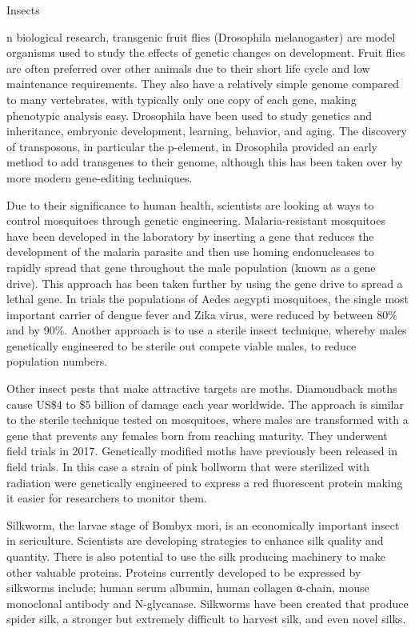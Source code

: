 Insects

n biological research, transgenic fruit flies (Drosophila melanogaster) are model organisms used to study the effects of genetic changes on development. Fruit flies are often preferred over other animals due to their short life cycle and low maintenance requirements. They also have a relatively simple genome compared to many vertebrates, with typically only one copy of each gene, making phenotypic analysis easy. Drosophila have been used to study genetics and inheritance, embryonic development, learning, behavior, and aging. The discovery of transposons, in particular the p-element, in Drosophila provided an early method to add transgenes to their genome, although this has been taken over by more modern gene-editing techniques.

Due to their significance to human health, scientists are looking at ways to control mosquitoes through genetic engineering. Malaria-resistant mosquitoes have been developed in the laboratory by inserting a gene that reduces the development of the malaria parasite and then use homing endonucleases to rapidly spread that gene throughout the male population (known as a gene drive). This approach has been taken further by using the gene drive to spread a lethal gene. In trials the populations of Aedes aegypti mosquitoes, the single most important carrier of dengue fever and Zika virus, were reduced by between 80\% and by 90\%. Another approach is to use a sterile insect technique, whereby males genetically engineered to be sterile out compete viable males, to reduce population numbers.

Other insect pests that make attractive targets are moths. Diamondback moths cause US\$4 to \$5 billion of damage each year worldwide. The approach is similar to the sterile technique tested on mosquitoes, where males are transformed with a gene that prevents any females born from reaching maturity. They underwent field trials in 2017. Genetically modified moths have previously been released in field trials. In this case a strain of pink bollworm that were sterilized with radiation were genetically engineered to express a red fluorescent protein making it easier for researchers to monitor them.

Silkworm, the larvae stage of Bombyx mori, is an economically important insect in sericulture. Scientists are developing strategies to enhance silk quality and quantity. There is also potential to use the silk producing machinery to make other valuable proteins. Proteins currently developed to be expressed by silkworms include; human serum albumin, human collagen α-chain, mouse monoclonal antibody and N-glycanase. Silkworms have been created that produce spider silk, a stronger but extremely difficult to harvest silk, and even novel silks.

